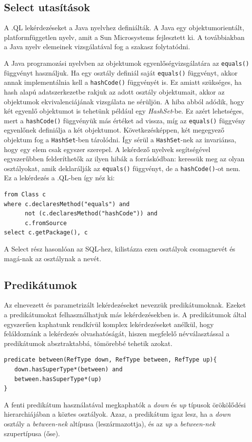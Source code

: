 \documentclass[a4paper,12pt]{report}
\begin{document}
\subsection{Select utasítások}
\par A .QL lekérdezéseket a Java nyelvhez definiálták. A Java egy objektumorientált, platformfüggetlen nyelv, amit a Sun Microsystems fejlesztett ki. A továbbiakban a Java nyelv elemeinek vizsgálatával fog a szakasz folytatódni. 
\par A Java programozási nyelvben az objektumok egyenlőségvizsgálatára az \texttt{equals()} függvényt használjuk. Ha egy osztály definiál saját \texttt{equals()} függvényt, akkor annak implementálnia kell a \texttt{hashCode()} függvényét is. Ez amiatt szükséges, ha hash alapú adatszerkezetbe rakjuk az adott osztály objektumait, akkor az objektumok ekvivalenciájának vizsgálata ne sérüljön. A hiba abból adódik, hogy két egyenlő objektumot is tehetünk például egy \textit{HashSet}-be. Ez azért lehetséges, mert a \texttt{hashCode()} függvényük más értéket ad vissza, míg az \texttt{equals()} függvény egyenlőnek definiálja a két objektumot. Következésképpen, két megegyező objektum fog a \texttt{HashSet}-ben tárolódni. Így sérül a \texttt{HashSet}-nek az invariánsa, hogy egy elem csak egyszer szerepel. A lekérdező nyelvek segítségével egyszerűbben felderíthetők az ilyen hibák a forráskódban: keressük meg az olyan osztályokat, amik deklarálják az \texttt{equals()} függvényt, de a \texttt{hashCode()}-ot nem. Ez a lekérdezés a .QL-ben így néz ki:
\begin{verbatim}
from Class c
where c.declaresMethod("equals") and
      not (c.declaresMethod("hashCode")) and
      c.fromSource
select c.getPackage(), c
\end{verbatim}
A Select rész hasonlóan az SQL-hez, kilistázza ezen osztályok csomagnevét és magá-nak az osztálynak a nevét.
\subsection{Predikátumok}
\par Az elnevezett és parametrizált lekérdezéseket nevezzük predikátumoknak. Ezeket a predikátumokat felhasználhatjuk más lekérdezésekben is. A predikátumok által egyszerűen kaphatunk rendkívül komplex lekérdezéseket anélkül, hogy feláldoznánk a lekérdezés olvashatóságát, hiszen megfelelő névválasztással a predikátumok absztraktabbá, tömörebbé tehetik azokat.
\begin{verbatim}
predicate between(RefType down, RefType between, RefType up){
   down.hasSuperType*(between) and
   between.hasSuperType*(up)
}
\end{verbatim}
A fenti predikátum használatával megkaphatók a \textit{down} és \textit{up} típusok örökölődési hierarchiájában a köztes osztályok. Azaz, a predikátum igaz lesz, ha a \textit{down} osztály a \textit{between-nek} altípusa (leszármazottja), és az \textit{up} a \textit{between-nek} szupertípusa (őse).
\end{document}
